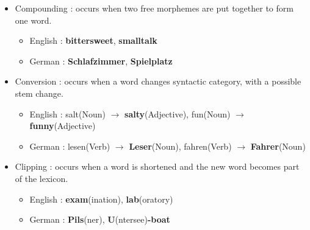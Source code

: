 \documentclass[11pt]{article}
\begin{document}
\begin{solution}
\begin{itemize}
	\item Compounding : occurs when two free morphemes are put together to form one word.
	\begin{itemize}
		\item English : \textbf{bittersweet}, \textbf{smalltalk} 
		\item German : \textbf{Schlafzimmer}, \textbf{Spielplatz}
	\end{itemize}
	\item Conversion : occurs when a word changes syntactic category, with a possible stem change.
	\begin{itemize}
		\item English : salt(Noun) $\rightarrow$ \textbf{salty}(Adjective), fun(Noun) $\rightarrow$ \textbf{funny}(Adjective)
		\item German : lesen(Verb) $\rightarrow$ \textbf{Leser}(Noun), fahren(Verb) $\rightarrow$ \textbf{Fahrer}(Noun)
	\end{itemize}
	\item Clipping : occurs when a word is shortened and the new word becomes part of the lexicon.
	\begin{itemize}
		\item English : \textbf{exam}(ination), \textbf{lab}(oratory)
		\item German : \textbf{Pils}(ner), \textbf{U}(ntersee)\textbf{-boat}
	\end{itemize}
\end{itemize}
\end{solution}

\vspace*{0.5cm}
\end{document}
